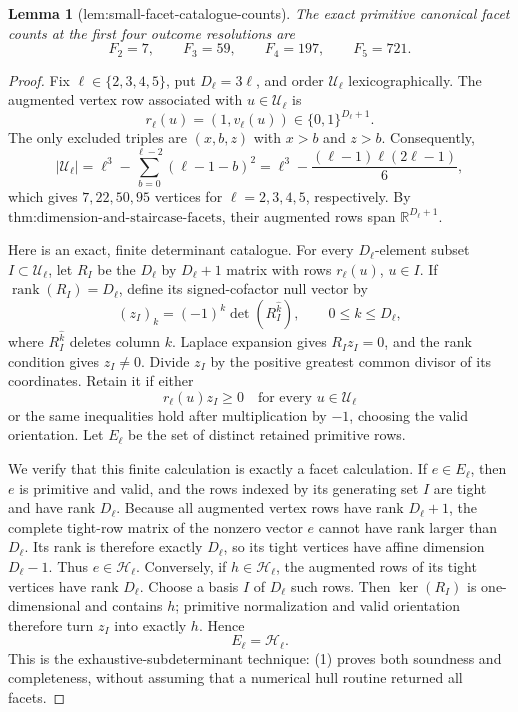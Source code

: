 \documentclass{article}
\newtheorem{lemma}{Lemma}
\begin{document}
\begin{lemma}[lem:small-facet-catalogue-counts]\label{lem:small-facet-catalogue-counts}
The exact primitive canonical facet counts at the first four outcome resolutions are
\[
F_2=7,\qquad F_3=59,\qquad F_4=197,\qquad F_5=721.
\]
\end{lemma}
\begin{proof}
Fix \(\ell\in\{2,3,4,5\}\), put \(D_\ell=3\ell\), and order \(\mathcal U_\ell\) lexicographically.  The augmented vertex row associated with \(u\in\mathcal U_\ell\) is
\[
r_\ell(u)=(1,v_\ell(u))\in\{0,1\}^{D_\ell+1}.
\]
The only excluded triples are \((x,b,z)\) with \(x>b\) and \(z>b\).  Consequently,
\[
|\mathcal U_\ell|
=\ell^3-\sum_{b=0}^{\ell-2}(\ell-1-b)^2
=\ell^3-\frac{(\ell-1)\ell(2\ell-1)}6,
\]
which gives \(7,22,50,95\) vertices for \(\ell=2,3,4,5\), respectively.  By \(\text{thm:dimension-and-staircase-facets}\), their augmented rows span \(\mathbb R^{D_\ell+1}\).

Here is an exact, finite determinant catalogue.  For every \(D_\ell\)-element subset \(I\subset\mathcal U_\ell\), let \(R_I\) be the \(D_\ell\) by \(D_\ell+1\) matrix with rows \(r_\ell(u)\), \(u\in I\).  If \(\operatorname{rank}(R_I)=D_\ell\), define its signed-cofactor null vector by
\[
(z_I)_k=(-1)^k\det(R_I^{\widehat k}),\qquad 0\le k\le D_\ell,
\]
where \(R_I^{\widehat k}\) deletes column \(k\).  Laplace expansion gives \(R_Iz_I=0\), and the rank condition gives \(z_I\ne0\).  Divide \(z_I\) by the positive greatest common divisor of its coordinates.  Retain it if either
\[
r_\ell(u)z_I\ge0\quad\text{for every }u\in\mathcal U_\ell
\]
or the same inequalities hold after multiplication by \(-1\), choosing the valid orientation.  Let \(E_\ell\) be the set of distinct retained primitive rows.

We verify that this finite calculation is exactly a facet calculation.  If \(e\in E_\ell\), then \(e\) is primitive and valid, and the rows indexed by its generating set \(I\) are tight and have rank \(D_\ell\).  Because all augmented vertex rows have rank \(D_\ell+1\), the complete tight-row matrix of the nonzero vector \(e\) cannot have rank larger than \(D_\ell\).  Its rank is therefore exactly \(D_\ell\), so its tight vertices have affine dimension \(D_\ell-1\).  Thus \(e\in\mathcal H_\ell\).  Conversely, if \(h\in\mathcal H_\ell\), the augmented rows of its tight vertices have rank \(D_\ell\).  Choose a basis \(I\) of \(D_\ell\) such rows.  Then \(\ker(R_I)\) is one-dimensional and contains \(h\); primitive normalization and valid orientation therefore turn \(z_I\) into exactly \(h\).  Hence
\[
E_\ell=\mathcal H_\ell. \tag{1}
\]
This is the exhaustive-subdeterminant technique: (1) proves both soundness and completeness, without assuming that a numerical hull routine returned all facets.


\end{proof}
\end{document}
